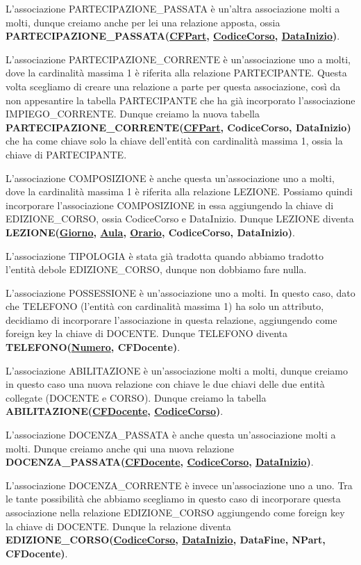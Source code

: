 \documentclass[11pt, a4paper, titlepage, oneside]{scrbook}
\begin{document}
L'associazione PARTECIPAZIONE\_PASSATA è un'altra associazione molti a molti, dunque creiamo anche per lei una relazione apposta, ossia \textbf{PARTECIPAZIONE\_PASSATA(\underline{CFPart}, \underline{CodiceCorso}, \underline{DataInizio})}.

L'associazione PARTECIPAZIONE\_CORRENTE è un'associazione uno a molti, dove la cardinalità massima 1 è riferita alla relazione PARTECIPANTE. Questa volta scegliamo di creare una relazione a parte per questa associazione, così da non appesantire la tabella PARTECIPANTE che ha già incorporato l'associazione IMPIEGO\_CORRENTE. 
Dunque creiamo la nuova tabella \textbf{PARTECIPAZIONE\_CORRENTE(\underline{CFPart}, CodiceCorso, DataInizio)} che ha come chiave solo la chiave dell'entità con cardinalità massima 1, ossia la chiave di PARTECIPANTE.

L'associazione COMPOSIZIONE è anche questa un'associazione uno a molti, dove la cardinalità massima 1 è riferita alla relazione LEZIONE. Possiamo quindi incorporare l'associazione COMPOSIZIONE in essa aggiungendo la chiave di EDIZIONE\_CORSO, ossia CodiceCorso e DataInizio. Dunque LEZIONE diventa \textbf{LEZIONE(\underline{Giorno}, \underline{Aula}, \underline{Orario}, CodiceCorso, DataInizio)}.

L'associazione TIPOLOGIA è stata già tradotta quando abbiamo tradotto l'entità debole EDIZIONE\_CORSO, dunque non dobbiamo fare nulla.

L'associazione POSSESSIONE è un'associazione uno a molti. In questo caso, dato che TELEFONO (l'entità con cardinalità massima 1) ha solo un attributo, decidiamo di incorporare l'associazione in questa relazione, aggiungendo come foreign key la chiave di DOCENTE. Dunque TELEFONO diventa \textbf{TELEFONO(\underline{Numero}, CFDocente)}.

L'associazione ABILITAZIONE è un'associazione molti a molti, dunque creiamo in questo caso una nuova relazione con chiave le due chiavi delle due entità collegate (DOCENTE e CORSO). Dunque creiamo la tabella \textbf{ABILITAZIONE(\underline{CFDocente}, \underline{CodiceCorso})}.

L'associazione DOCENZA\_PASSATA è anche questa un'associazione molti a molti. Dunque creiamo anche qui una nuova relazione \textbf{DOCENZA\_PASSATA(\underline{CFDocente}, \underline{CodiceCorso}, \underline{DataInizio})}.

L'associazione DOCENZA\_CORRENTE è invece un'associazione uno a uno. Tra le tante possibilità che abbiamo scegliamo in questo caso di incorporare questa associazione nella relazione EDIZIONE\_CORSO aggiungendo come foreign key la chiave di DOCENTE. Dunque la relazione diventa \textbf{EDIZIONE\_CORSO(\underline{CodiceCorso}, \underline{DataInizio}, DataFine, NPart, CFDocente)}.
\end{document}
